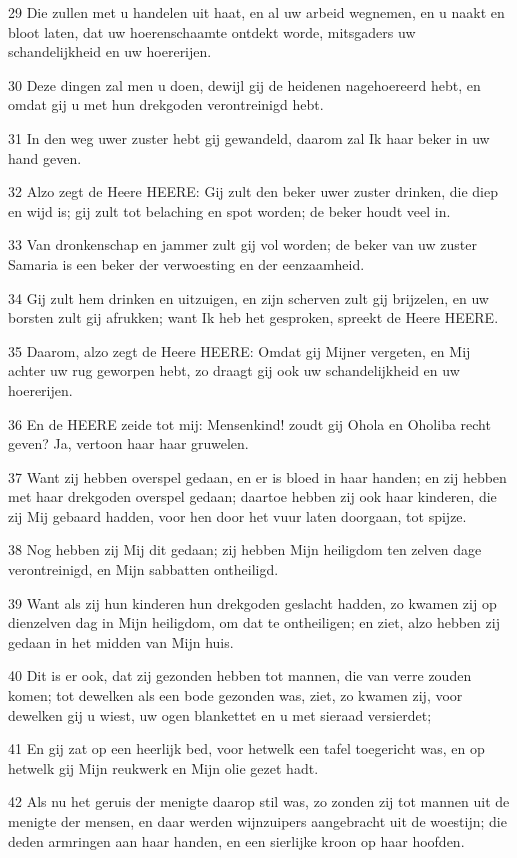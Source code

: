 \par 29 Die zullen met u handelen uit haat, en al uw arbeid wegnemen, en u naakt en bloot laten, dat uw hoerenschaamte ontdekt worde, mitsgaders uw schandelijkheid en uw hoererijen.
\par 30 Deze dingen zal men u doen, dewijl gij de heidenen nagehoereerd hebt, en omdat gij u met hun drekgoden verontreinigd hebt.
\par 31 In den weg uwer zuster hebt gij gewandeld, daarom zal Ik haar beker in uw hand geven.
\par 32 Alzo zegt de Heere HEERE: Gij zult den beker uwer zuster drinken, die diep en wijd is; gij zult tot belaching en spot worden; de beker houdt veel in.
\par 33 Van dronkenschap en jammer zult gij vol worden; de beker van uw zuster Samaria is een beker der verwoesting en der eenzaamheid.
\par 34 Gij zult hem drinken en uitzuigen, en zijn scherven zult gij brijzelen, en uw borsten zult gij afrukken; want Ik heb het gesproken, spreekt de Heere HEERE.
\par 35 Daarom, alzo zegt de Heere HEERE: Omdat gij Mijner vergeten, en Mij achter uw rug geworpen hebt, zo draagt gij ook uw schandelijkheid en uw hoererijen.
\par 36 En de HEERE zeide tot mij: Mensenkind! zoudt gij Ohola en Oholiba recht geven? Ja, vertoon haar haar gruwelen.
\par 37 Want zij hebben overspel gedaan, en er is bloed in haar handen; en zij hebben met haar drekgoden overspel gedaan; daartoe hebben zij ook haar kinderen, die zij Mij gebaard hadden, voor hen door het vuur laten doorgaan, tot spijze.
\par 38 Nog hebben zij Mij dit gedaan; zij hebben Mijn heiligdom ten zelven dage verontreinigd, en Mijn sabbatten ontheiligd.
\par 39 Want als zij hun kinderen hun drekgoden geslacht hadden, zo kwamen zij op dienzelven dag in Mijn heiligdom, om dat te ontheiligen; en ziet, alzo hebben zij gedaan in het midden van Mijn huis.
\par 40 Dit is er ook, dat zij gezonden hebben tot mannen, die van verre zouden komen; tot dewelken als een bode gezonden was, ziet, zo kwamen zij, voor dewelken gij u wiest, uw ogen blankettet en u met sieraad versierdet;
\par 41 En gij zat op een heerlijk bed, voor hetwelk een tafel toegericht was, en op hetwelk gij Mijn reukwerk en Mijn olie gezet hadt.
\par 42 Als nu het geruis der menigte daarop stil was, zo zonden zij tot mannen uit de menigte der mensen, en daar werden wijnzuipers aangebracht uit de woestijn; die deden armringen aan haar handen, en een sierlijke kroon op haar hoofden.
